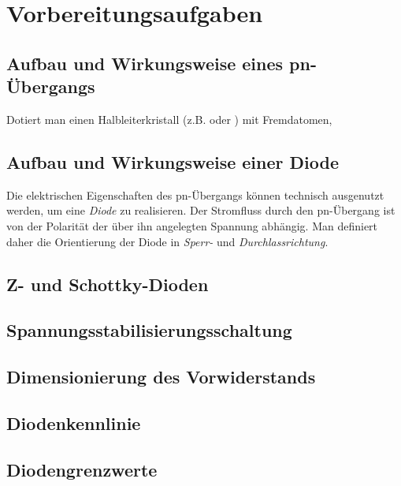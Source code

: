\documentclass[a4paper, 12pt]{article}
\begin{document}
  
  \clearpage
  \setcounter{page}{1}

\section{Vorbereitungsaufgaben}

\subsection{Aufbau und Wirkungsweise eines pn-Übergangs}
Dotiert man einen Halbleiterkristall (z.B.  oder ) mit Fremdatomen, 


\subsection{Aufbau und Wirkungsweise einer Diode}
Die elektrischen Eigenschaften des pn-Übergangs können technisch ausgenutzt werden, um eine \emph{Diode} zu realisieren. Der Stromfluss durch den pn-Übergang ist von der Polarität der über ihn angelegten Spannung abhängig. Man definiert daher die Orientierung der Diode in \emph{Sperr-} und \emph{Durchlassrichtung}.

\subsection{Z- und Schottky-Dioden}

\subsection{Spannungsstabilisierungsschaltung}

\subsection{Dimensionierung des Vorwiderstands}

\subsection{Diodenkennlinie}

\subsection{Diodengrenzwerte}


\end{document}
